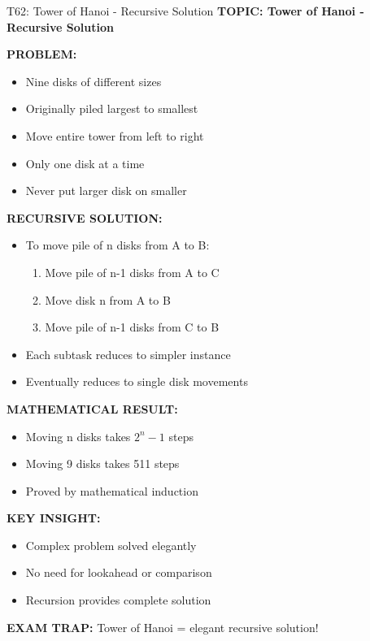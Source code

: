 \documentclass[8pt]{beamer}
\begin{document}
	\begin{frame}{T62: Tower of Hanoi - Recursive Solution}
		\fontsize{6.5}{7.5}\selectfont
		\textbf{TOPIC: Tower of Hanoi - Recursive Solution}
		
		\vspace{0.1cm}
		\textbf{PROBLEM:}
		\begin{itemize}
			\item Nine disks of different sizes
			\item Originally piled largest to smallest
			\item Move entire tower from left to right
			\item Only one disk at a time
			\item Never put larger disk on smaller
		\end{itemize}
		
		\vspace{0.1cm}
		\textbf{RECURSIVE SOLUTION:}
		\begin{itemize}
			\item To move pile of n disks from A to B:
			\begin{enumerate}
				\item Move pile of n-1 disks from A to C
				\item Move disk n from A to B
				\item Move pile of n-1 disks from C to B
			\end{enumerate}
			\item Each subtask reduces to simpler instance
			\item Eventually reduces to single disk movements
		\end{itemize}
		
		\vspace{0.1cm}
		\textbf{MATHEMATICAL RESULT:}
		\begin{itemize}
			\item Moving n disks takes $2^n - 1$ steps
			\item Moving 9 disks takes 511 steps
			\item Proved by mathematical induction
		\end{itemize}
		
		\vspace{0.1cm}
		\textbf{KEY INSIGHT:}
		\begin{itemize}
			\item Complex problem solved elegantly
			\item No need for lookahead or comparison
			\item Recursion provides complete solution
		\end{itemize}
		
		\textcolor{myred}{\textbf{EXAM TRAP:}} Tower of Hanoi = \textcolor{myblue}{elegant recursive solution}!
	\end{frame}
	
\end{document}
